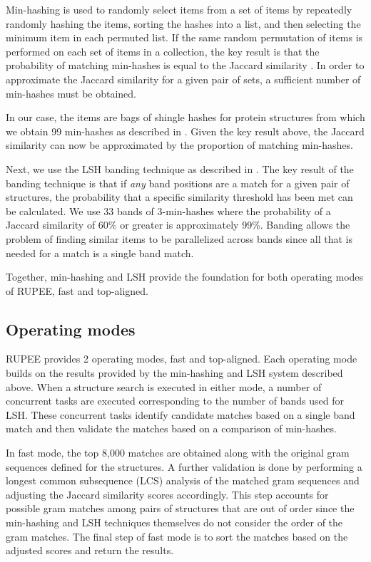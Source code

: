 \documentclass[letter,center,fleqn]{NAR}
\begin{document}
Min-hashing is used to randomly select items from a set of items by repeatedly randomly hashing the items, sorting the hashes into a list, and then selecting the minimum item in each permuted list.
If the same random permutation of items is performed on each set of items in a collection, the key result is that the probability of matching min-hashes is equal to the Jaccard similarity \cite{Broder1998}.
In order to approximate the Jaccard similarity for a given pair of sets, a sufficient number of min-hashes must be obtained. 

In our case, the items are bags of shingle hashes for protein structures from which we obtain 99 min-hashes as described in \cite{Rajaraman2012}. 
Given the key result above, the Jaccard similarity can now be approximated by the proportion of matching min-hashes. 

Next, we use the LSH banding technique as described in \cite{Rajaraman2012}.
The key result of the banding technique is that if \emph{any} band positions are a match for a given pair of structures, the probability that a specific similarity threshold has been met can be calculated. 
We use 33 bands of 3-min-hashes where the probability of a Jaccard similarity of 60\% or greater is approximately 99\%. 
Banding allows the problem of finding similar items to be parallelized across bands since all that is needed for a match is a single band match. 

Together, min-hashing and LSH provide the foundation for both operating modes of RUPEE, fast and top-aligned.

\subsection{Operating modes}

RUPEE provides 2 operating modes, fast and top-aligned. 
Each operating mode builds on the results provided by the min-hashing and LSH system described above. 
When a structure search is executed in either mode, a number of concurrent tasks are executed corresponding to the number of bands used for LSH. 
These concurrent tasks identify candidate matches based on a single band match and then validate the matches based on a comparison of min-hashes. 

In fast mode, the top 8,000 matches are obtained along with the original gram sequences defined for the structures.
A further validation is done by performing a longest common subsequence (LCS) analysis of the matched gram sequences and adjusting the Jaccard similarity scores accordingly.
This step accounts for possible gram matches among pairs of structures that are out of order since the min-hashing and LSH techniques themselves do not consider the order of the gram matches.
The final step of fast mode is to sort the matches based on the adjusted scores and return the results. 
\end{document}
